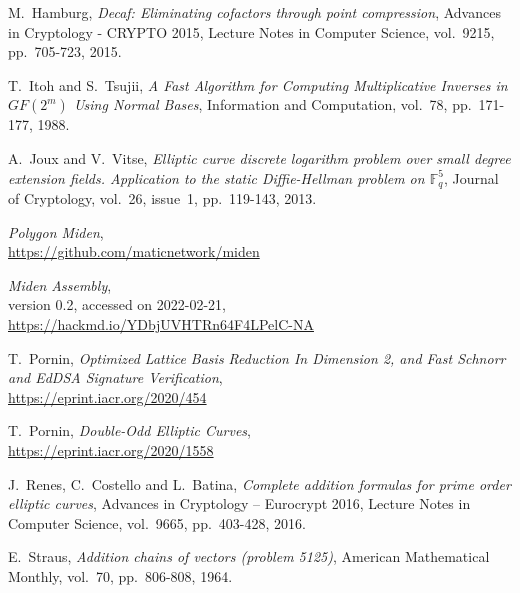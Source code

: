 \documentclass{llncs}
\newcommand{\GF}{GF}
\begin{document}
\begin{thebibliography}{20}
M.~Hamburg,
\emph{Decaf: Eliminating cofactors through point compression},
Advances in Cryptology - CRYPTO 2015, Lecture Notes in Computer Science,
vol.~9215, pp.~705-723, 2015.

T.~Itoh and S.~Tsujii,
\emph{A Fast Algorithm for Computing Multiplicative Inverses in
$\GF(2^m)$ Using Normal Bases},
Information and Computation, vol.~78, pp.~171-177, 1988.

A.~Joux and V.~Vitse,
\emph{Elliptic curve discrete logarithm problem over small degree
extension fields. Application to the static Diffie-Hellman problem on
$\mathbb{F}_q^5$},
Journal of Cryptology, vol.~26, issue~1, pp.~119-143, 2013.

\emph{Polygon Miden},\\
\url{https://github.com/maticnetwork/miden}

\emph{Miden Assembly},\\
version 0.2, accessed on 2022-02-21,\\
\url{https://hackmd.io/YDbjUVHTRn64F4LPelC-NA}

T.~Pornin,
\emph{Optimized Lattice Basis Reduction In Dimension 2, and Fast Schnorr
and EdDSA Signature Verification},\\
\url{https://eprint.iacr.org/2020/454}

T.~Pornin,
\emph{Double-Odd Elliptic Curves},\\
\url{https://eprint.iacr.org/2020/1558}

J.~Renes, C.~Costello and L.~Batina,
\emph{Complete addition formulas for prime order elliptic curves},
Advances in Cryptology – Eurocrypt 2016, Lecture Notes in Computer Science,
vol.~9665, pp.~403-428, 2016.

E.~Straus,
\emph{Addition chains of vectors (problem 5125)},
American Mathematical Monthly, vol.~70, pp.~806-808, 1964.

\end{thebibliography}

\end{document}
